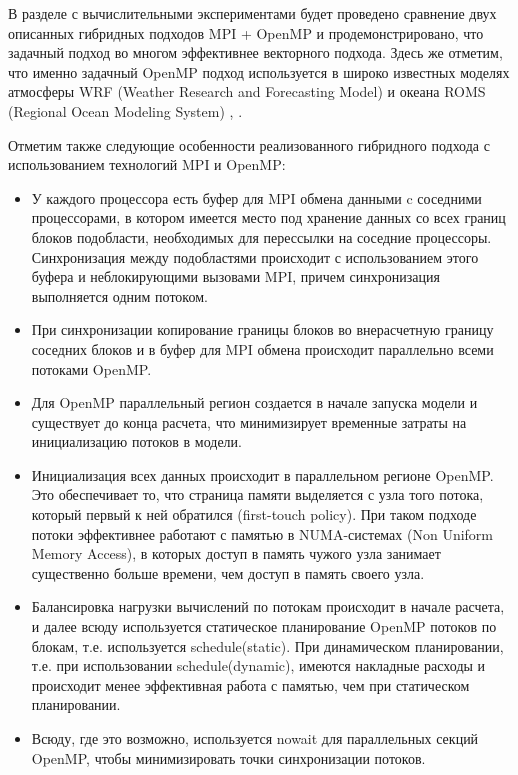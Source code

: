 В разделе с вычислительными экспериментами будет проведено сравнение двух описанных гибридных подходов MPI + OpenMP и продемонстрировано, что задачный подход во многом эффективнее векторного подхода. Здесь же отметим, что именно задачный OpenMP подход используется в широко известных моделях атмосферы WRF (Weather Research and Forecasting Model) \cite{WRF2016} и океана ROMS (Regional Ocean Modeling System) \cite{Liu2019ParallelIA}, \cite{SHCHEPETKIN2005347}.

Отметим также следующие особенности реализованного гибридного подхода с использованием технологий MPI и OpenMP:

\begin{itemize}
\item У каждого процессора есть буфер для MPI обмена данными c соседними процессорами, в котором имеется место под хранение данных со всех границ блоков подобласти, необходимых для перессылки на соседние процессоры. Синхронизация между подобластями происходит с использованием этого буфера и неблокирующими вызовами MPI, причем синхронизация выполняется одним потоком.

\item При синхронизации копирование границы блоков во внерасчетную границу соседних блоков и в буфер для MPI обмена происходит параллельно всеми потоками OpenMP.

\item Для OpenMP параллельный регион создается в начале запуска модели и существует до конца расчета, что минимизирует временные затраты на инициализацию потоков в модели.

\item Инициализация всех данных происходит в параллельном регионе OpenMP. Это обеспечивает то, что страница памяти выделяется с узла того потока, который первый к ней обратился (first-touch policy). При таком подходе потоки эффективнее работают с памятью в NUMA-системах (Non Uniform Memory Access), в которых доступ в память чужого узла занимает существенно больше времени, чем доступ в память своего узла. 

\item Балансировка нагрузки вычислений по потокам происходит в начале расчета, и далее всюду используется статическое планирование OpenMP потоков по блокам, т.е. используется schedule(static). При динамическом планировании, т.е. при использовании schedule(dynamic), имеются накладные расходы  и происходит менее эффективная работа с памятью, чем при статическом планировании.
 
\item Всюду, где это возможно, используется nowait для параллельных секций OpenMP, чтобы минимизировать точки синхронизации потоков.
\end{itemize}


